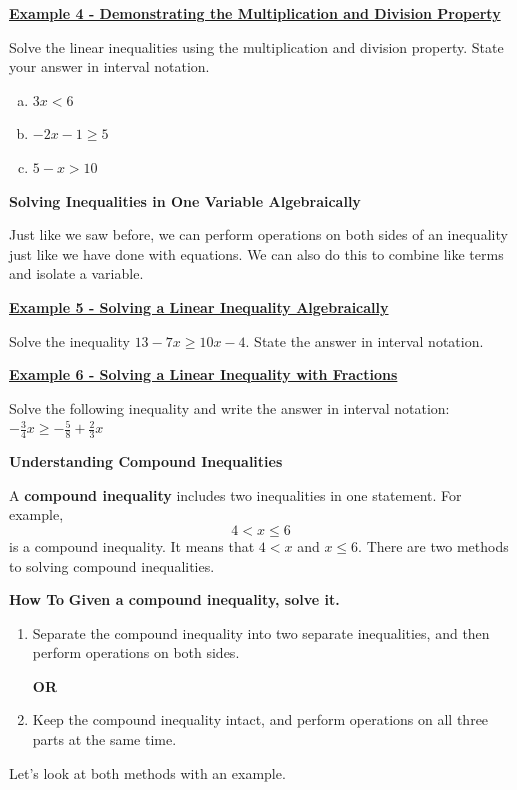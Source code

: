 \documentclass[12pt]{book}
\begin{document}
\underline{\textbf{Example 4 - Demonstrating the Multiplication and Division Property}}

Solve the linear inequalities using the multiplication and division property. State your answer in interval notation.
\begin{enumerate}[(a)]
    \item $3x< 6$
    \vspace{18mm}
    \item $ -2x-1 \geq 5$ 
    \vspace{18mm}
    \item $5-x > 10$
    \vspace{18mm}
\end{enumerate}

{\large \textbf{Solving Inequalities in One Variable Algebraically}}
\vspace{3mm}

Just like we saw before, we can perform operations on both sides of an inequality just like we have done with equations. We can also do this to combine like terms and isolate a variable.
\vspace{3mm}

\underline{\textbf{Example 5 - Solving a Linear Inequality Algebraically}}

Solve the inequality $13-7x \geq 10x-4$. State the answer in interval notation.
\vspace{40mm}

\underline{\textbf{Example 6 - Solving a Linear Inequality with Fractions}}

Solve the following inequality and write the answer in interval notation: $-\frac{3}{4}x \geq -\frac{5}{8}+ \frac{2}{3}x$
\vspace{30mm}

\newpage

{\large \textbf{Understanding Compound Inequalities}}
\vspace{3mm}

A \textbf{compound inequality} includes two inequalities in one statement. For example, $$4 < x \leq 6$$ is a compound inequality. It means that $4 < x$ and $x \leq 6$. There are two methods to solving compound inequalities. 

\begin{boxR}
    \textbf{How To}
    \vspace{1mm}
    \hline
    \vspace{2mm}
    \textbf{Given a compound inequality, solve it.}
    \begin{enumerate}
    \item Separate the compound inequality into two separate inequalities, and then perform operations on both sides.
    
    \vspace{2mm}
    \centerline{\textbf{OR}}
    \vspace{2mm}
    \item Keep the compound inequality intact, and perform operations on all three parts at the same time. 
\end{enumerate}
    
\end{boxR}
Let's look at both methods with an example. 
\vspace{3mm}
\end{document}
